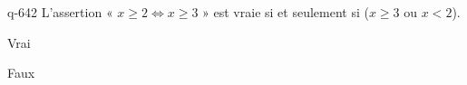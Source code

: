 \begin{truefalse}{q-642}
L'assertion « $x\geq 2 \Leftrightarrow x \geq 3$ » est vraie si et seulement si ($x\geq 3$ ou $x<2$).
\item* Vrai
\item Faux
\end{truefalse}

